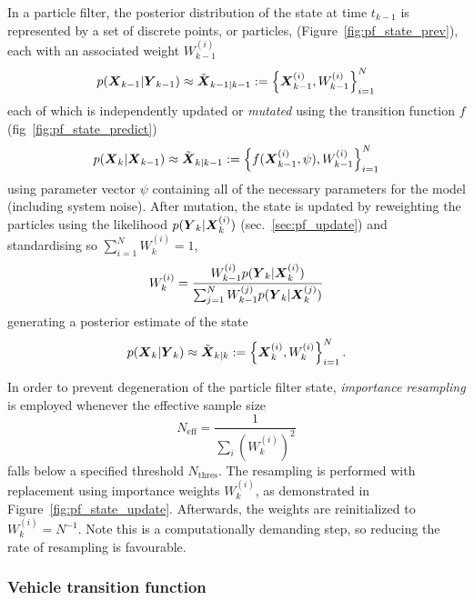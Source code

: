 In a particle filter, the posterior distribution of the state at time $t_{k-1}$
is represented by a set of discrete points, or particles, (Figure~\ref{fig:pf_state_prev}),
each with an associated weight $W_{k-1}^{(i)}$
\begin{equation}
p(\mbox{$\boldsymbol{X}$}_{k-1} | \mbox{$\boldsymbol{Y}$}_{k-1}) \approx \tilde{\mbox{$\boldsymbol{X}$}}_{k-1|k-1} 
:= \left\{\mbox{$\boldsymbol{X}$}_{k-1}^{(i)}, W_{k-1}^{(i)}\right\}_{i=1}^N
\end{equation}
each of which is independently updated or \emph{mutated} using the transition function $f$ (fig~\ref{fig:pf_state_predict})
\begin{equation}
p(\mbox{$\boldsymbol{X}$}_k | \mbox{$\boldsymbol{X}$}_{k-1}) \approx \tilde{\mbox{$\boldsymbol{X}$}}_{k|k-1} := 
\left\{f(\mbox{$\boldsymbol{X}$}_{k-1}^{(i)}, \psi), W_{k-1}^{(i)}\right\}_{i=1}^N
\end{equation}
using parameter vector $\psi$ containing all of the necessary parameters
for the model (including system noise).
After mutation, 
the state is updated by reweighting the particles using the likelihood $p(\mbox{$\boldsymbol{Y}$}_k | \mbox{$\boldsymbol{X}$}_k^{(i)})$ 
(sec.~\ref{sec:pf_update}) and standardising so $\sum_{i=1}^N W_k^{(i)} = 1$,
\begin{equation*}
W_k^{(i)} = \frac{W_{k-1}^{(i)} p(\mbox{$\boldsymbol{Y}$}_k | \mbox{$\boldsymbol{X}$}_k^{(i)})}{
    \sum_{j=1}^N W_{k-1}^{(j)} p(\mbox{$\boldsymbol{Y}$}_k | \mbox{$\boldsymbol{X}$}_k^{(j)})
}
\end{equation*}
generating a posterior estimate of the state
\begin{equation}
p(\mbox{$\boldsymbol{X}$}_k | \mbox{$\boldsymbol{Y}$}_k) \approx \tilde{\mbox{$\boldsymbol{X}$}}_{k|k} := 
\left\{\mbox{$\boldsymbol{X}$}_{k}^{(i)}, W_{k}^{(i)}\right\}_{i=1}^N.
\end{equation}

In order to prevent degeneration of the particle filter state,
\emph{importance resampling} is employed whenever the 
effective sample size 
\begin{equation}
\label{eq:neff}
N_{\text{eff}} = \frac{1}{\sum_i (W_k^{(i)})^2}
\end{equation}
falls below a specified threshold $N_{\text{thres}}$.
The resampling is performed with replacement using importance weights $W_k^{(i)}$,
as demonstrated in Figure~\ref{fig:pf_state_update}.
Afterwards, the weights are reinitialized to $W_k^{(i)} = N^{-1}$.
Note this is a computationally demanding step,
so reducing the rate of resampling is favourable.



\subsubsection{Vehicle transition function}
\label{sec:pf_prediction}

